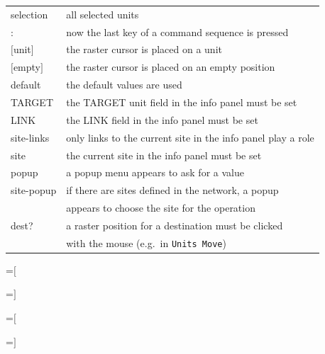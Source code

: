 {\newpage
\clearpage
\samepage \begin{tabular}{|ll|}
\hline
selection       & all selected units\\ 
:               & now the last key of a command sequence is pressed\\ 
$[$unit$]$      & the raster cursor is placed on a unit\\ 
$[$empty$]$     & the raster cursor is placed on an empty position\\ 
default         & the default values are used\\ 
TARGET          & the TARGET unit field in the info panel must be set\\ 
LINK            & the LINK field in the info panel must be set\\ 
site-links      & only links to the current site in the info panel
play a role\\ 
site            & the current site in the info panel must be set\\ 
popup           & a popup menu appears to ask for a value\\ 
site-popup      & if there are sites defined in the network, a popup\\ 
                & appears to choose the site for the operation\\ 
dest?           & a raster position for a destination must be clicked\\ 
                & with the mouse (e.g.\ in {\tt Units Move})\\ 
\hline
\end{tabular}
}

{\newpage
\clearpage
\samepage \setbox\sizebox=\hbox{$[$}\box\sizebox
}

{\newpage
\clearpage
\samepage \setbox\sizebox=\hbox{$]$}\box\sizebox
}

{\newpage
\clearpage
\samepage \setbox\sizebox=\hbox{$[$}\box\sizebox
}

{\newpage
\clearpage
\samepage \setbox\sizebox=\hbox{$]$}\box\sizebox
}

